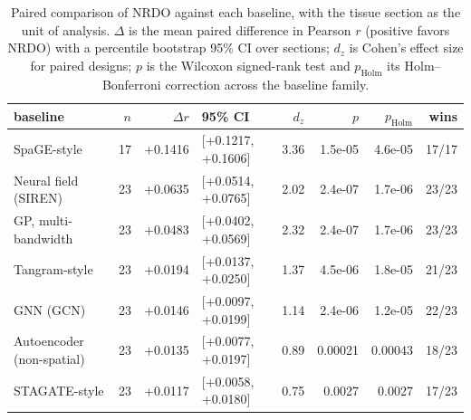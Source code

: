 \begin{table}[htbp]
\centering
\footnotesize
\setlength{\tabcolsep}{3pt}
\caption{Paired comparison of NRDO against each baseline, with the tissue section as the unit of analysis. $\Delta$ is the mean paired difference in Pearson $r$ (positive favors NRDO) with a percentile bootstrap 95\% CI over sections; $d_z$ is Cohen's effect size for paired designs; $p$ is the Wilcoxon signed-rank test and $p_{\mathrm{Holm}}$ its Holm--Bonferroni correction across the baseline family.}
\label{tab:paired}
\begin{tabular}{lrrlrrrr}
\toprule
baseline & $n$ & $\Delta r$ & 95\% CI & $d_z$ & $p$ & $p_{\mathrm{Holm}}$ & wins\\
\midrule
SpaGE-style & 17 & +0.1416 & [+0.1217, +0.1606] & 3.36 & 1.5e-05 & 4.6e-05 & 17/17 \\
Neural field (SIREN) & 23 & +0.0635 & [+0.0514, +0.0765] & 2.02 & 2.4e-07 & 1.7e-06 & 23/23 \\
GP, multi-bandwidth & 23 & +0.0483 & [+0.0402, +0.0569] & 2.32 & 2.4e-07 & 1.7e-06 & 23/23 \\
Tangram-style & 23 & +0.0194 & [+0.0137, +0.0250] & 1.37 & 4.5e-06 & 1.8e-05 & 21/23 \\
GNN (GCN) & 23 & +0.0146 & [+0.0097, +0.0199] & 1.14 & 2.4e-06 & 1.2e-05 & 22/23 \\
Autoencoder (non-spatial) & 23 & +0.0135 & [+0.0077, +0.0197] & 0.89 & 0.00021 & 0.00043 & 18/23 \\
STAGATE-style & 23 & +0.0117 & [+0.0058, +0.0180] & 0.75 & 0.0027 & 0.0027 & 17/23 \\
\bottomrule
\end{tabular}
\end{table}
